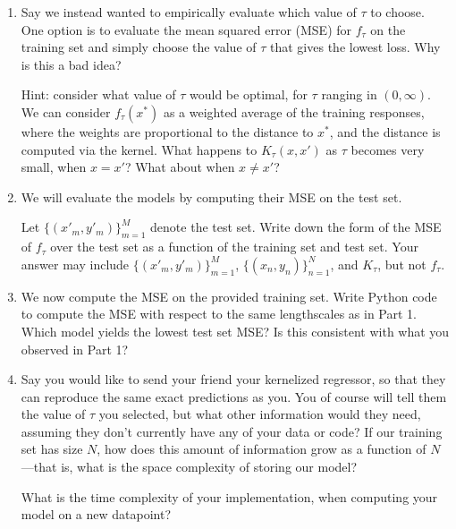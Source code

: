 \documentclass[submit]{harvardml}
\begin{document}
\begin{problem}
\begin{enumerate}
\item Say we instead wanted to empirically evaluate which value of $\tau$ to choose. One option is to evaluate the mean squared error (MSE) for $f_{\tau}$ on the training set and simply choose the value of $\tau$ that gives the lowest loss. Why is this a bad idea?
    
Hint: consider what value of $\tau$ would be optimal, for $\tau$ ranging in $(0, \infty)$. We can consider $f_\tau(x^*)$ as a weighted average of the training responses, where the weights are proportional to the distance to $x^*$, and the distance is computed via the kernel. What happens to $K_\tau(x, x')$ as $\tau$ becomes very small, when $x = x'$? What about when $x \neq x'$?

\item We will evaluate the models by computing their MSE on the test set. 

Let $\{(x'_m, y'_m)\}_{m = 1} ^M$ denote the test set. Write down the form of the MSE of $f_\tau$ over the test set as a function of the training set and test set. Your answer may include $\{(x'_m, y'_m)\}_{m = 1} ^M$, $\{(x_n, y_n)\}_{n = 1} ^N$, and $K_\tau$, but not $f_\tau$.

\item We now compute the MSE on the provided training set. Write Python code to compute the MSE with respect to the same lengthscales as in Part 1. Which model yields the lowest test set MSE? Is this consistent with what you observed in Part 1?

\item 
Say you would like to send your friend your kernelized regressor, so that they can reproduce the same exact predictions as you. You of course will tell them the value of $\tau$ you selected, but what other information would they need, assuming they don't currently have any of your data or code? If our training set has size $N$, how does this amount of information grow as a function of $N$—that is, what is the space complexity of storing our model?

What is the time complexity of your implementation, when computing your model on a new datapoint? 
\end{enumerate}

\end{problem}

\newpage
\end{document}
